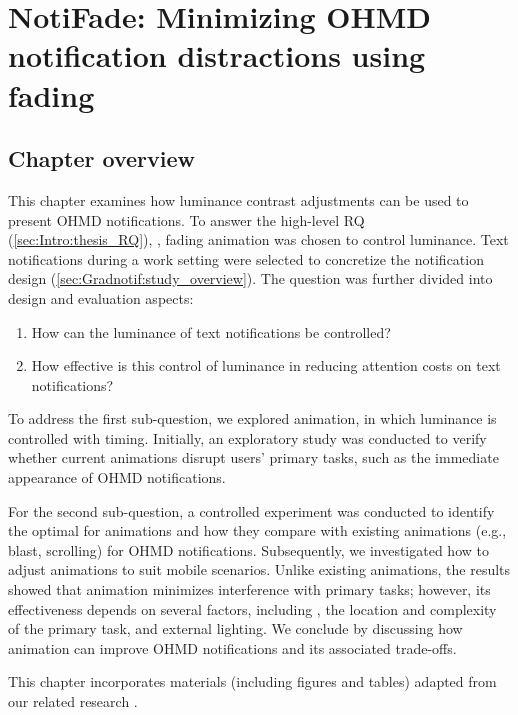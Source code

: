 
\chapter{NotiFade: Minimizing OHMD notification distractions using fading}
\label{ch:Gradnotif}


\section{Chapter overview}

This chapter examines how luminance contrast adjustments can be used to present OHMD notifications. 
To answer the high-level RQ (\autoref{sec:Intro:thesis_RQ}), \RQMainGradNotif{}, fading animation was chosen to control luminance. Text notifications during a work setting were selected to concretize the notification design (\autoref{sec:Gradnotif:study_overview}). 
The question was further divided into design and evaluation aspects:
\begin{enumerate}
    \item How can the luminance of text notifications be controlled?
    \item How effective is this control of luminance in reducing attention costs on text notifications?
\end{enumerate}

To address the first sub-question, we explored \fading{} animation, in which luminance is controlled with timing. 
Initially, an exploratory study was conducted to verify whether current animations disrupt users' primary tasks, such as the immediate appearance of OHMD notifications. 

For the second sub-question, a controlled experiment was conducted to identify the optimal \fadeduration{} for \fading{} animations and how they compare with existing animations (e.g., blast, scrolling) for OHMD notifications. Subsequently, we investigated how to adjust \fading{} animations to suit mobile scenarios. 
Unlike existing animations, the results showed that \fading{} animation minimizes interference with primary tasks; however, its effectiveness depends on several factors, including \fadeduration{}, the location and complexity of the primary task, and external lighting. We conclude by discussing how \fading{} animation can improve OHMD notifications and its associated trade-offs.

This chapter incorporates materials (including figures and tables) adapted from our related research \cite{janaka_notifade_2023}.

